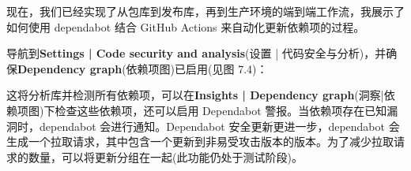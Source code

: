 
现在，我们已经实现了从包库到发布库，再到生产环境的端到端工作流，我展示了如何使用 dependabot 结合 GitHub Actions 来自动化更新依赖项的过程。


导航到\textbf{Settings | Code security and analysis}(设置 | 代码安全与分析)，并确保\textbf{Dependency graph}(依赖项图)已启用(见图 7.4)：


这将分析库并检测所有依赖项，可以在\textbf{Insights | Dependency graph}(洞察|依赖项图)下检查这些依赖项，还可以启用 Dependabot 警报。当依赖项存在已知漏洞时，dependabot 会进行通知。Dependabot 安全更新更进一步，dependabot 会生成一个拉取请求，其中包含一个更新到非易受攻击版本的版本。为了减少拉取请求的数量，可以将更新分组在一起(此功能仍处于测试阶段)。


